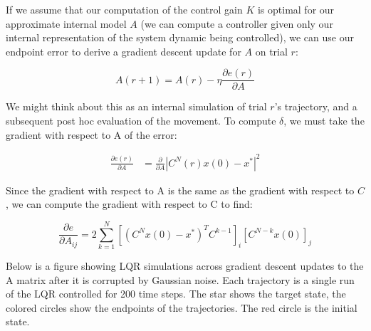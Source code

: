 \documentclass[
  a4paper,
]{article}
\begin{document}
If we assume that our computation of the control gain \(K\) is optimal
for our approximate internal model \(A\) (we can compute a controller
given only our internal representation of the system dynamic being
controlled), we can use our endpoint error to derive a gradient descent
update for \(A\) on trial \(r\):

\[
A(r+1) = A(r) - \eta\frac{\partial{e(r)}}{\partial{A}}
\]

We might think about this as an internal simulation of trial \(r\)'s
trajectory, and a subsequent post hoc evaluation of the movement. To
compute \(\delta\), we must take the gradient with respect to A of the
error:

\[
\begin{aligned}
\frac{\partial{e(r)}}{\partial{A}} &= \frac{\partial{}}{\partial{A}}{|C^N(r)x(0) - x^*|^2}
\end{aligned}
\]

Since the gradient with respect to A is the same as the gradient with
respect to \(C\), we can compute the gradient with respect to C to find:

\[
\frac{\partial{e}}{\partial{A_{ij}}} = 2\sum_{k=1}^N\left[(C^Nx(0) - x^*)^TC^{k-1}\right]_i\left[C^{N-k}x(0)\right]_j
\]

Below is a figure showing LQR simulations across gradient descent
updates to the A matrix after it is corrupted by Gaussian noise. Each
trajectory is a single run of the LQR controlled for 200 time steps. The
star shows the target state, the colored circles show the endpoints of
the trajectories. The red circle is the initial state.
\end{document}
